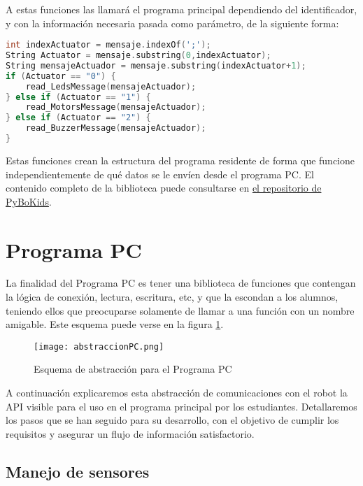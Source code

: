 A estas funciones las llamará el programa principal dependiendo del identificador, y con la información necesaria pasada como parámetro, de la siguiente forma:

\begin{lstlisting}[language=C,caption={Decisión sobre los actuadores con el primer valor del mensaje}]
int indexActuator = mensaje.indexOf(';');
String Actuator = mensaje.substring(0,indexActuator);
String mensajeActuador = mensaje.substring(indexActuator+1);
if (Actuator == "0") {
	read_LedsMessage(mensajeActuador);
} else if (Actuator == "1") {
	read_MotorsMessage(mensajeActuador);
} else if (Actuator == "2") {
	read_BuzzerMessage(mensajeActuador);
}
\end{lstlisting}




Estas funciones crean la estructura del programa residente de forma que funcione independientemente de qué datos se le envíen desde el programa PC. El contenido completo de la biblioteca puede consultarse en \href{https://github.com/JdeRobot/PyBoKids/tree/main/PyBoKids%202.0/Mbot_residente}{el repositorio de PyBoKids}.

\section{Programa PC}\label{sec:pc}
La finalidad del Programa PC es tener una biblioteca de funciones que contengan la lógica de conexión, lectura, escritura, etc, y que la escondan a los alumnos, teniendo ellos que preocuparse solamente de llamar a una función con un nombre amigable. Este esquema puede verse en la figura \ref{img:abstraccionPC}.

\begin{figure}[h]
	\texttt{[image: abstraccionPC.png]}
	\centering
	\caption{Esquema de abstracción para el Programa PC}
	\label{img:abstraccionPC}
\end{figure}

A continuación explicaremos esta abstracción de comunicaciones con el robot la API visible para el uso en el programa principal por los estudiantes. Detallaremos los pasos que se han seguido para su desarrollo, con el objetivo de cumplir los requisitos y asegurar un flujo de información satisfactorio.

\subsection{Manejo de sensores}\label{subsec:sensoresPython}

